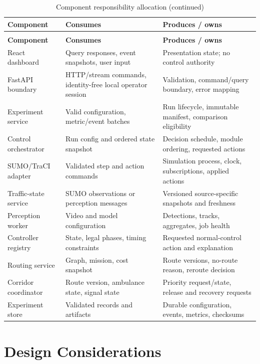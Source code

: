\begin{longtable}{p{}p{}p{}}
\caption{Component responsibility allocation}\label{tab:components}\\
\toprule
\textbf{Component} & \textbf{Consumes} & \textbf{Produces / owns}\\
\midrule\endfirsthead
\caption[]{Component responsibility allocation (continued)}\\
\toprule
\textbf{Component} & \textbf{Consumes} & \textbf{Produces / owns}\\
\midrule\endhead
React dashboard & Query responses, event snapshots, user input & Presentation state; no control authority\\
FastAPI boundary & HTTP/stream commands, identity-free local operator session & Validation, command/query boundary, error mapping\\
Experiment service & Valid configuration, metric/event batches & Run lifecycle, immutable manifest, comparison eligibility\\
Control orchestrator & Run config and ordered state snapshot & Decision schedule, module ordering, requested actions\\
SUMO/TraCI adapter & Validated step and action commands & Simulation process, clock, subscriptions, applied actions\\
Traffic-state service & SUMO observations or perception messages & Versioned source-specific snapshots and freshness\\
Perception worker & Video and model configuration & Detections, tracks, aggregates, job health\\
Controller registry & State, legal phases, timing constraints & Requested normal-control action and explanation\\
Routing service & Graph, mission, cost snapshot & Route versions, no-route reason, reroute decision\\
Corridor coordinator & Route version, ambulance state, signal state & Priority request/state, release and recovery requests\\
Experiment store & Validated records and artifacts & Durable configuration, events, metrics, checksums\\
\bottomrule
\end{longtable}

\section{Design Considerations}

